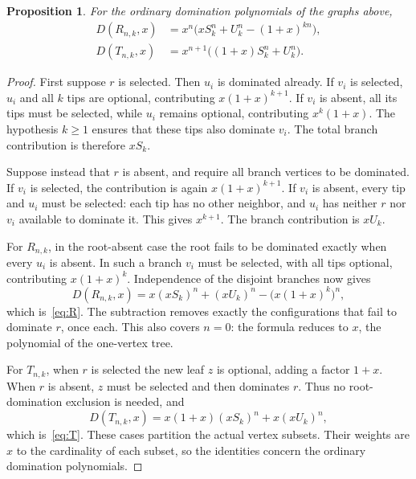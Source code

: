 \documentclass[11pt]{article}
\newtheorem{proposition}[theorem]{Proposition}
\newcommand{\D}{D}
\begin{document}
\begin{proposition}\label{prop:formula}
For the ordinary domination polynomials of the graphs above,
\begin{align}
 \D(R_{n,k},x)&=x^n\bigl(xS_k^n+U_k^n-(1+x)^{kn}\bigr),\label{eq:R}\\
 \D(T_{n,k},x)&=x^{n+1}\bigl((1+x)S_k^n+U_k^n\bigr).\label{eq:T}
\end{align}
\end{proposition}
\begin{proof}
First suppose $r$ is selected. Then $u_i$ is dominated already. If $v_i$ is selected, $u_i$ and all $k$ tips are optional, contributing $x(1+x)^{k+1}$. If $v_i$ is absent, all its tips must be selected, while $u_i$ remains optional, contributing $x^k(1+x)$. The hypothesis $k\ge1$ ensures that these tips also dominate $v_i$. The total branch contribution is therefore $xS_k$.

Suppose instead that $r$ is absent, and require all branch vertices to be dominated. If $v_i$ is selected, the contribution is again $x(1+x)^{k+1}$. If $v_i$ is absent, every tip and $u_i$ must be selected: each tip has no other neighbor, and $u_i$ has neither $r$ nor $v_i$ available to dominate it. This gives $x^{k+1}$. The branch contribution is $xU_k$.

For $R_{n,k}$, in the root-absent case the root fails to be dominated exactly when every $u_i$ is absent. In such a branch $v_i$ must be selected, with all tips optional, contributing $x(1+x)^k$. Independence of the disjoint branches now gives
\[
 \D(R_{n,k},x)=x(xS_k)^n+(xU_k)^n-
                    \bigl(x(1+x)^k\bigr)^n,
\]
which is~\eqref{eq:R}. The subtraction removes exactly the configurations that fail to dominate $r$, once each. This also covers $n=0$: the formula reduces to $x$, the polynomial of the one-vertex tree.

For $T_{n,k}$, when $r$ is selected the new leaf $z$ is optional, adding a factor $1+x$. When $r$ is absent, $z$ must be selected and then dominates $r$. Thus no root-domination exclusion is needed, and
\[
 \D(T_{n,k},x)=x(1+x)(xS_k)^n+x(xU_k)^n,
\]
which is~\eqref{eq:T}. These cases partition the actual vertex subsets. Their weights are $x$ to the cardinality of each subset, so the identities concern the ordinary domination polynomials.
\end{proof}
\end{document}
